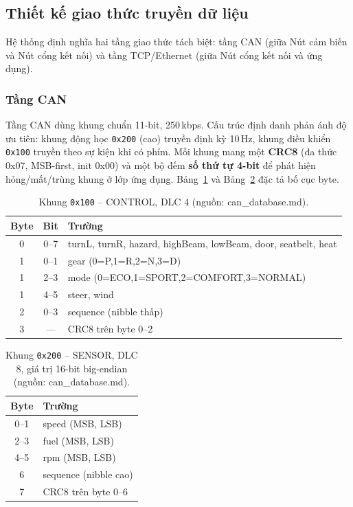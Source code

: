 \documentclass[../DoAn.tex]{subfiles}
\begin{document}
\subsection{Thiết kế giao thức truyền dữ liệu}
\label{section:4.2.4}

Hệ thống định nghĩa hai tầng giao thức tách biệt: tầng CAN (giữa Nút cảm biến và
Nút cổng kết nối) và tầng TCP/Ethernet (giữa Nút cổng kết nối và ứng dụng).

\subsubsection{Tầng CAN}

Tầng CAN dùng khung chuẩn 11-bit, 250\,kbps. Cấu trúc định danh phản ánh độ ưu
tiên: khung động học \texttt{0x200} (cao) truyền định kỳ 10\,Hz, khung điều
khiển \texttt{0x100} truyền theo sự kiện khi có phím. Mỗi khung mang một
\textbf{CRC8} (đa thức 0x07, MSB-first, init 0x00) và một bộ đếm \textbf{số thứ
tự 4-bit} để phát hiện hỏng/mất/trùng khung ở lớp ứng dụng.
Bảng~\ref{tab:can-0x100} và Bảng~\ref{tab:can-0x200} đặc tả bố cục byte.

\begin{table}[H]
  \centering
  \caption{Khung \texttt{0x100} -- CONTROL, DLC 4 (nguồn: can\_database.md).}
  \label{tab:can-0x100}
  \begin{tabular}{@{}ccl@{}}
    \toprule
    \textbf{Byte} & \textbf{Bit} & \textbf{Trường} \\
    \midrule
    0 & 0--7 & turnL, turnR, hazard, highBeam, lowBeam, door, seatbelt, heat \\
    1 & 0--1 & gear (0=P,1=R,2=N,3=D) \\
    1 & 2--3 & mode (0=ECO,1=SPORT,2=COMFORT,3=NORMAL) \\
    1 & 4--5 & steer, wind \\
    2 & 0--3 & sequence (nibble thấp) \\
    3 & --- & CRC8 trên byte 0--2 \\
    \bottomrule
  \end{tabular}
\end{table}

\begin{table}[H]
  \centering
  \caption{Khung \texttt{0x200} -- SENSOR, DLC 8, giá trị 16-bit big-endian (nguồn: can\_database.md).}
  \label{tab:can-0x200}
  \begin{tabular}{@{}cl@{}}
    \toprule
    \textbf{Byte} & \textbf{Trường} \\
    \midrule
    0--1 & speed (MSB, LSB) \\
    2--3 & fuel (MSB, LSB) \\
    4--5 & rpm (MSB, LSB) \\
    6 & sequence (nibble cao) \\
    7 & CRC8 trên byte 0--6 \\
    \bottomrule
  \end{tabular}
\end{table}
\end{document}
